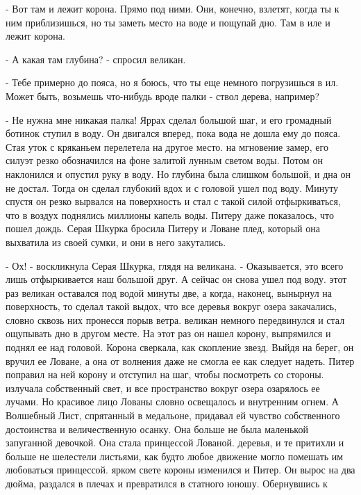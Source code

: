 \par- Вот там и лежит корона. Прямо под ними. Они, конечно, взлетят, 
когда ты к ним приблизишься, но ты заметь место на воде и пощупай дно. 
Там в иле и лежит корона.
\par- А какая там глубина? - спросил великан.
\par- Тебе примерно до пояса, но я боюсь, что ты еще немного 
погрузишься в ил. Может быть, возьмешь что-нибудь вроде палки - ствол 
дерева, например?
\par- Не нужна мне никакая палка!
 Яррах сделал большой шаг, и его громадный ботинок ступил в 
воду. Он двигался вперед, пока вода не дошла ему до пояса. Стая уток с 
кряканьем перелетела на другое место.
 на мгновение замер, его силуэт резко обозначился на фоне 
залитой лунным светом воды. Потом он наклонился и опустил руку в воду. 
Но глубина была слишком большой, и дна он не достал. Тогда он сделал 
глубокий вдох и с головой ушел под воду. Минуту спустя он резко 
вырвался на поверхность и стал с такой силой отфыркиваться, что в 
воздух поднялись миллионы капель воды.
 Питеру даже показалось, что пошел дождь. Серая Шкурка 
бросила Питеру и Ловане плед, который она выхватила из своей сумки, и 
они в него закутались.
\par- Ох! - воскликнула Серая Шкурка, глядя на великана. - 
Оказывается, это всего лишь отфыркивается наш большой друг. А сейчас 
он снова ушел под воду.
 этот раз великан оставался под водой минуты две, а когда, 
наконец, вынырнул на поверхность, то сделал такой выдох, что все 
деревья вокруг озера закачались, словно сквозь них пронесся порыв 
ветра.
 великан немного передвинулся и стал ощупывать дно в другом 
месте. На этот раз он нашел корону, выпрямился и поднял ее над 
головой. Корона сверкала, как скопление звезд. Выйдя на берег, он 
вручил ее Ловане, а она от волнения даже не смогла ее как следует 
надеть. Питер поправил на ней корону и отступил на шаг, чтобы 
посмотреть со стороны.
 излучала собственный свет, и все пространство вокруг озера 
озарялось ее лучами. Но красивое лицо Лованы словно освещалось и 
внутренним огнем. А Волшебный Лист, спрятанный в медальоне, придавал 
ей чувство собственного достоинства и величественную осанку. Она 
больше не была маленькой запуганной девочкой. Она стала принцессой 
Лованой.
 деревья, и те притихли и больше не шелестели листьями, как 
будто любое движение могло помешать им любоваться принцессой.
 ярком свете короны изменился и Питер. Он вырос на два дюйма, 
раздался в плечах и превратился в статного юношу. Обернувшись к 
